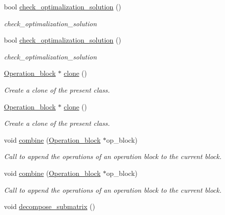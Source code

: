\begin{DoxyCompactItemize}
bool \hyperlink{class_decomposition___base_aa01a8d70b76215a235cb0d71894b2595}{check\+\_\+optimalization\+\_\+solution} ()
\begin{DoxyCompactList}\small\item\em check\+\_\+optimalization\+\_\+solution \end{DoxyCompactList}\item 
bool \hyperlink{class_decomposition___base_aa01a8d70b76215a235cb0d71894b2595}{check\+\_\+optimalization\+\_\+solution} ()
\begin{DoxyCompactList}\small\item\em check\+\_\+optimalization\+\_\+solution \end{DoxyCompactList}\item 
\hyperlink{class_operation__block}{Operation\+\_\+block} $\ast$ \hyperlink{class_operation__block_a2aa75d20b21c3b5802730c0abe54db5e}{clone} ()
\begin{DoxyCompactList}\small\item\em Create a clone of the present class. \end{DoxyCompactList}\item 
\hyperlink{class_operation__block}{Operation\+\_\+block} $\ast$ \hyperlink{class_operation__block_af5d1f81be3a54eada1de293d1e9877c5}{clone} ()
\begin{DoxyCompactList}\small\item\em Create a clone of the present class. \end{DoxyCompactList}\item 
void \hyperlink{class_operation__block_a60062cf6f48ebfdcaae9db3367a66147}{combine} (\hyperlink{class_operation__block}{Operation\+\_\+block} $\ast$op\+\_\+block)
\begin{DoxyCompactList}\small\item\em Call to append the operations of an operation block to the current block. \end{DoxyCompactList}\item 
void \hyperlink{class_operation__block_a60062cf6f48ebfdcaae9db3367a66147}{combine} (\hyperlink{class_operation__block}{Operation\+\_\+block} $\ast$op\+\_\+block)
\begin{DoxyCompactList}\small\item\em Call to append the operations of an operation block to the current block. \end{DoxyCompactList}\item 
void \hyperlink{class_n___qubit___decomposition_a7d01c357e16448fc65f0a4fa77a1d66e}{decompose\+\_\+submatrix} ()

\end{DoxyCompactItemize}
